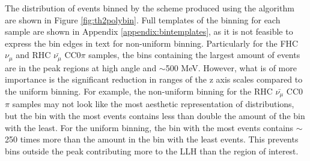 The distribution of events binned by the scheme produced using the algorithm are shown in Figure \ref{fig:th2polybin}. Full templates of the binning for each sample are shown in Appendix \ref{appendix:bintemplates}, as it is not feasible to express the bin edges in text for non-uniform binning. Particularly for the FHC $\nu_{\mu}$ and RHC $\bar{\nu_{\mu}}$ CC0$\pi$ samples, the bins containing the largest amount of events are in the peak regions at high angle and $\sim$500 MeV. However, what is of more importance is the significant reduction in ranges of the z axis scales compared to the uniform binning. For example, the non-uniform binning for the RHC $\bar{\nu_{\mu}}$ CC0$\pi$ samples may not look like the most aesthetic representation of distributions, but the bin with the most events contains less than double the amount of the bin with the least. For the uniform binning, the bin with the most events contains $\sim$250 times more than the amount in the bin with the least events. This prevents bins outside the peak contributing more to the LLH than the region of interest.

